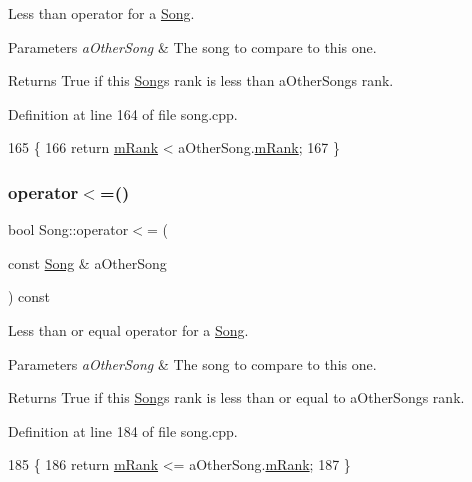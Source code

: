 Less than operator for a \mbox{\hyperlink{class_song}{Song}}. 


\begin{DoxyParams}{Parameters}
{\em a\+Other\+Song} & The song to compare to this one. \\
\hline
\end{DoxyParams}
\begin{DoxyReturn}{Returns}
True if this \mbox{\hyperlink{class_song}{Song}}\textquotesingle{}s rank is less than a\+Other\+Song\textquotesingle{}s rank. 
\end{DoxyReturn}


Definition at line 164 of file song.\+cpp.


\begin{DoxyCode}
165 \{
166     \textcolor{keywordflow}{return} \mbox{\hyperlink{class_song_a18b47d2545fc5e7795cad143092c97e7}{mRank}} < aOtherSong.\mbox{\hyperlink{class_song_a18b47d2545fc5e7795cad143092c97e7}{mRank}};
167 \}
\end{DoxyCode}
\mbox{\label{class_song_a3a4608e2f7744e5c1c8db350be3b24e9}} 
\subsubsection{\texorpdfstring{operator$<$=()}{operator<=()}}
{\footnotesize\ttfamily bool Song\+::operator$<$= (\begin{DoxyParamCaption}\item[{const \mbox{\hyperlink{class_song}{Song}} \&}]{a\+Other\+Song }\end{DoxyParamCaption}) const}



Less than or equal operator for a \mbox{\hyperlink{class_song}{Song}}. 


\begin{DoxyParams}{Parameters}
{\em a\+Other\+Song} & The song to compare to this one. \\
\hline
\end{DoxyParams}
\begin{DoxyReturn}{Returns}
True if this \mbox{\hyperlink{class_song}{Song}}\textquotesingle{}s rank is less than or equal to a\+Other\+Song\textquotesingle{}s rank. 
\end{DoxyReturn}


Definition at line 184 of file song.\+cpp.


\begin{DoxyCode}
185 \{
186     \textcolor{keywordflow}{return} \mbox{\hyperlink{class_song_a18b47d2545fc5e7795cad143092c97e7}{mRank}} <= aOtherSong.\mbox{\hyperlink{class_song_a18b47d2545fc5e7795cad143092c97e7}{mRank}};
187 \}
\end{DoxyCode}
\mbox{\label{class_song_a1a6cc11df009afe710a7e6103e4c4221}} 
